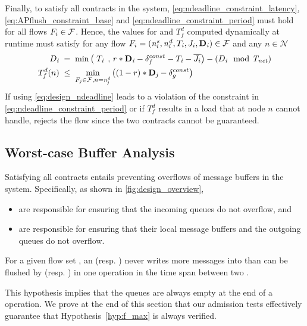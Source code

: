 Finally, to satisfy all contracts in the system, \eqref{eq:ndeadline_constraint_latency}, \eqref{eq:APflush_constraint_base} and \eqref{eq:ndeadline_constraint_period} must hold for all flows $F_{i} \in \mathcal{F}$.
Hence, the values for \ndeadlinei and $T_f^d$ computed dynamically at runtime must satisfy for any flow $F_{i} = (\mathit{n^s_{i}},\mathit{n^d_{i}},T_{\mathit{i}},J_{i},\mathbf{D}_{\mathit{i}}) \in \mathcal{F}$ and any $n \in \mathcal{N}$
\begin{align}
\label{eq:design_ndeadline}
D_{\mathit{i}} \;
	& = \; \min \left(\; T_{\mathit{i}} \;\, , \,  r*\mathbf{D}_{\mathit{i}} - \delta_f^{const} - T_{\mathit{i}} - \overline{J_{i}} \right) - (D_{\mathit{i}} \mod {\mathit{T_{net}}}) \\
\label{eq:design_delay_destination}
T_f^d(n) \;
	& \leq \; \min_{F_j\in \mathcal{F}, n = \mathit{n^d_{j}}}
	\left( (1-r)*\mathbf{D}_{\mathit{j}} - \delta_g^{const} \right)
\end{align}
If using \eqref{eq:design_ndeadline} leads to a violation of the constraint in \eqref{eq:ndeadline_constraint_period} or if $T_f^d$ results in a load that \ap at node $n$ cannot handle, \DRP rejects the flow since the two contracts cannot be guaranteed.


\subsection{Worst-case Buffer Analysis}
\label{subsec:WC_buffer}

Satisfying all contracts entails preventing overflows of message buffers in the system.
Specifically, as shown in \cref{fig:design_overview},
\begin{itemize}
	\item \APs are responsible for ensuring that the incoming \bolt queues do not overflow, and
	\item \CPs are responsible for ensuring that their local message buffers and the outgoing \bolt queues do not overflow.
\end{itemize}

\squarepar{%
  To formulate the admission tests for {\ap}s and {\cp}s, we first need the worst-case buffer sizes (\ie maximum number of messages in a buffer) induced by a given flow set \flowset.
  For ease of exposition, we make the following hypothesis.%
}
\begin{hypothesis}\label{hyp:f_max}
For a given flow set \flowset, an \ap (resp. \cp) never writes more messages into \bolt than can be flushed by \cp (resp. \ap) in one \emph{\opflush} operation in the time span between two \emph{\opflush}.
\end{hypothesis}
This hypothesis implies that the \bolt queues are always empty at the end of a \opflush operation.
We prove at the end of this section that our admission tests effectively guarantee that Hypothesis~\ref{hyp:f_max} is always verified.


